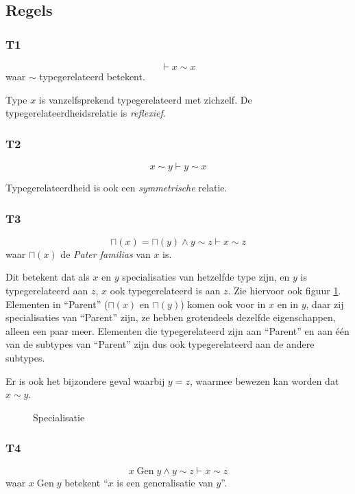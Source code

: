 \documentclass[11pt]{article}
\begin{document}
\subsection{Regels}
\label{sse:regels}
\subsubsection{T1}

\[ 
  \vdash x \sim x
\] waar $\sim$ typegerelateerd betekent.

Type $x$ is vanzelfsprekend typegerelateerd met zichzelf. De typegerelateerdheidsrelatie
is \emph{reflexief}.

\subsubsection{T2}
\[ 
  x \sim y \vdash y \sim x
\]

Typegerelateerdheid is ook een \emph{symmetrische} relatie.

\subsubsection{T3}
\label{s2e:t3}
\[
  \sqcap (x) = \sqcap (y) \wedge y \sim z \vdash x \sim z
\] waar $\sqcap (x)$ de \emph{Pater familias} van $x$ is.

Dit betekent dat als $x$ en $y$ specialisaties van hetzelfde
type zijn, en $y$ is typegerelateerd aan $z$, $x$ ook typegerelateerd is
aan $z$. Zie hiervoor ook figuur \ref{fig:specialisatie}. Elementen in
``Parent'' ($\sqcap(x)$ en $\sqcap(y)$) komen ook voor in $x$ en in $y$, daar
zij specialisaties van ``Parent'' zijn, ze hebben grotendeels dezelfde
eigenschappen, alleen een paar meer. Elementen die typegerelateerd zijn aan
``Parent'' en aan \'e\'en van de subtypes van ``Parent'' zijn dus ook
typegerelateerd aan de andere subtypes.

Er is ook het bijzondere geval waarbij $y=z$, waarmee bewezen kan worden
dat $x \sim y$.

\begin{figure}
  \centering
  \caption{Specialisatie}
  \label{fig:specialisatie}
\end{figure}


\subsubsection{T4}
\[
  x \operatorname{Gen} y \wedge y \sim z \vdash x \sim z
\] waar $x \operatorname{Gen} y$ betekent ``$x$ is een generalisatie van $y$''.
\end{document}
